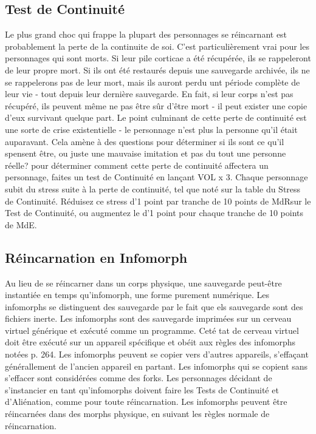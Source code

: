\subsection{Test de Continuité} 

Le plus grand choc qui frappe la plupart des personnages se réincarnant est probablement la perte de la continuite de soi. C'est particulièrement vrai pour les personnages qui sont morts. Si leur pile corticae a été récupérée, ils se rappeleront de leur propre mort. Si ils ont été restaurés depuis une sauvegarde archivée, ils ne se rappelerons pas de leur mort, mais ils auront perdu unt période complète de leur vie - tout depuis leur dernière sauvegarde. En fait, si leur corps n'est pas récupéré, ils peuvent même ne pas être sûr d'être mort - il peut exister une copie d'eux survivant quelque part. Le point culminant de cette perte de continuité est une sorte de crise existentielle - le personnage n'est plus la personne qu'il était auparavant. Cela amène à des questions pour déterminer si ils sont ce qu'il spensent être, ou juste une mauvaise imitation et pas du tout une personne réelle? pour déterminer comment cette perte de continuité affectera un personnage, faites un test de Continuité en lançant VOL x 3. Chaque personnage subit du stress suite à la perte de continuité, tel que noté sur la table du Stress de Continuité. Réduisez ce stress d'1 point par tranche de 10 points de MdRsur le Test de Continuité, ou augmentez le d'1 point pour chaque tranche de 10 points de MdE. 

\subsection{Réincarnation en Infomorph} 

Au lieu de se réincarner dans un corps physique, une sauvegarde peut-être instantiée en temps qu'infomorph, une forme purement numérique. Les infomorphs se distinguent des sauvegarde par le fait que els sauvegarde sont des fichiers inerte. Les infomorphs sont des sauvegarde imprimées sur un cerveau virtuel générique et exécuté comme un programme. Ceté tat de cerveau virtuel doit être exécuté sur un appareil spécifique et obéit aux règles des infomorphs notées p. 264. Les infomorphs peuvent se copier vers d'autres appareils, s'effaçant générallement de l'ancien appareil en partant. Les infomorphs qui se copient sans s'effacer sont considérées comme des forks. Les personnages décidant de s'instancier en tant qu'infomorphs doivent faire les Tests de Continuité et d'Aliénation, comme pour toute réincarnation. Les infomorphs peuvent être réincarnées dans des morphs physique, en suivant les règles normale de réincarnation. 



